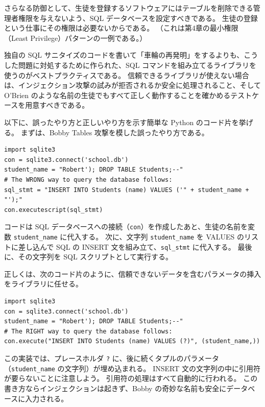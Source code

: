 \documentclass[uplatex]{jsarticle}
\def\label#1{}%
\begin{document}
さらなる防御として、生徒を登録するソフトウェアにはテーブルを削除できる管理者権限を与えないよう、SQL データベースを設定すべきである。
生徒の登録という仕事にその権限は必要ないからである。
（これは第4章の最小権限（Least Privilege）パターンの一例である。）

独自の SQL サニタイズのコードを書いて「車輪の再発明」をするよりも、こうした問題に対処するために作られた、SQL コマンドを組み立てるライブラリを使うのがベストプラクティスである。
信頼できるライブラリが使えない場合は、インジェクション攻撃の試みが拒否されるか安全に処理されること、そして O'Brien のような名前の生徒でもすべて正しく動作することを確かめるテストケースを用意すべきである。

\begin{exa}\label{exa:ch10-sql-wrong}
以下に、誤ったやり方と正しいやり方を示す簡単な Python のコード片を挙げる。
まずは、Bobby Tables 攻撃を模した誤ったやり方である。
\begin{verbatim}
import sqlite3
con = sqlite3.connect('school.db')
student_name = "Robert'); DROP TABLE Students;--"
# The WRONG way to query the database follows:
sql_stmt = "INSERT INTO Students (name) VALUES ('" + student_name + "');"
con.executescript(sql_stmt)
\end{verbatim}
コードは SQL データベースへの接続（\texttt{con}）を作成したあと、生徒の名前を変数 \texttt{student\_name} に代入する。
次に、文字列 \texttt{student\_name} を VALUES のリストに差し込んで SQL の INSERT 文を組み立て、\texttt{sql\_stmt} に代入する。
最後に、その文字列を SQL スクリプトとして実行する。
\end{exa}

\begin{exa}\label{exa:ch10-sql-right}
正しくは、次のコード片のように、信頼できないデータを含むパラメータの挿入をライブラリに任せる。
\begin{verbatim}
import sqlite3
con = sqlite3.connect('school.db')
student_name = "Robert'); DROP TABLE Students;--"
# The RIGHT way to query the database follows:
con.execute("INSERT INTO Students (name) VALUES (?)", (student_name,))
\end{verbatim}
この実装では、プレースホルダ \texttt{?} に、後に続くタプルのパラメータ（\texttt{student\_name} の文字列）が埋め込まれる。
INSERT 文の文字列の中に引用符が要らないことに注意しよう。
引用符の処理はすべて自動的に行われる。
この書き方ならインジェクションは起きず、Bobby の奇妙な名前も安全にデータベースに入力される。
\end{exa}
\end{document}
